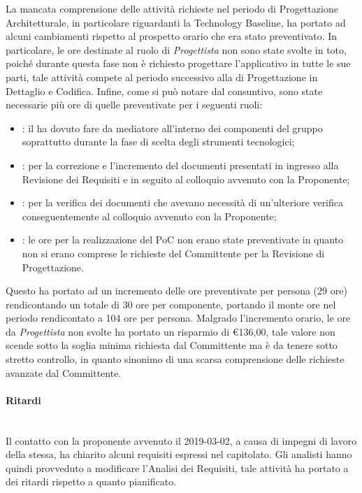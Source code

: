 La mancata comprensione delle attività richieste nel periodo di Progettazione Architetturale, in particolare riguardanti la Technology Baseline, ha portato ad alcuni cambiamenti rispetto al prospetto orario che era stato preventivato. In particolare, le ore destinate al ruolo di \textit{Progettista} non sono state svolte in toto, poiché durante questa fase non è richiesto progettare l'applicativo in tutte le sue parti, tale attività compete al periodo successivo alla di Progettazione in Dettaglio e Codifica. Infine, come si può notare dal consuntivo, sono state necessarie più ore di quelle preventivate per i seguenti ruoli:
\begin{itemize}
	\item \RdP{}: il \Res{} ha dovuto fare da mediatore all'interno dei componenti del gruppo soprattutto durante la fase di scelta degli strumenti tecnologici;
	\item \ana{}: per la correzione e l'incremento del documenti presentati in ingresso alla Revisione dei Requisiti e in seguito al colloquio avvenuto con la Proponente;
	\item \ver{}: per la verifica dei documenti che avevano necessità di un'ulteriore verifica conseguentemente al colloquio avvenuto con la Proponente;
	\item \progr{}: le ore per la realizzazione del PoC non erano state preventivate  in quanto non si erano comprese le richieste del Committente per la Revisione di Progettazione. 
\end{itemize} 
Questo ha portato ad un incremento delle ore preventivate per persona (29 ore) rendicontando un totale di 30 ore per componente, portando il monte ore nel periodo rendicontato a 104 ore per persona.
Malgrado l'incremento orario, le ore da \textit{Progettista} non svolte ha portato un risparmio di \euro 136,00, tale valore non scende sotto la soglia minima richiesta dal Committente ma è da tenere sotto stretto controllo, in quanto sinonimo di una scarsa comprensione delle richieste avanzate dal Committente.
\paragraph{Ritardi}\mbox{}\\
Il contatto con la proponente avvenuto il 2019-03-02, a causa di impegni di lavoro della stessa, ha chiarito alcuni requisiti espressi nel capitolato. Gli analisti hanno quindi provveduto a modificare l'Analisi dei Requisiti, tale attività ha portato a dei ritardi rispetto a quanto pianificato.

